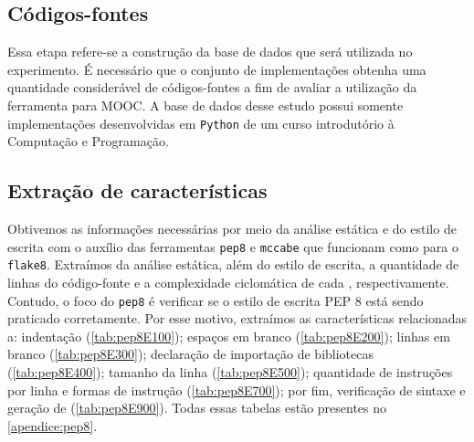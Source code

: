 		\subsection{Códigos-fontes}	
		
			Essa etapa refere-se a construção da base de dados que será utilizada no experimento.
			É necessário que o conjunto de implementações obtenha uma quantidade considerável de
			códigos-fontes a fim de avaliar a utilização da ferramenta para \acs{MOOC}. A
			base de dados desse estudo possui somente implementações desenvolvidas em \texttt{Python}
			de um curso introdutório à Computação e Programação.
			
		\subsection{Extração de características}
					
			Obtivemos as informações necessárias por meio da análise estática e do estilo de   
			escrita com o auxílio das ferramentas \texttt{pep8} \cite{pep8} e \texttt{mccabe}
			\cite{mccabe} que funcionam como  para o \texttt{flake8}.
			Extraímos da análise estática, além do estilo de escrita, a quantidade de linhas
			do código-fonte e a complexidade ciclomática de cada , respectivamente.
			Contudo, o foco do \texttt{pep8} é verificar se o estilo de escrita PEP 8 \cite{van2001pep}
			está sendo praticado corretamente. Por esse motivo, extraímos as características
			relacionadas a: indentação (\cref{tab:pep8E100}); espaços em branco
			(\cref{tab:pep8E200}); linhas em branco (\cref{tab:pep8E300}); declaração de
			importação de bibliotecas (\cref{tab:pep8E400}); tamanho da linha (\cref{tab:pep8E500});
			quantidade de instruções por linha e formas de instrução (\cref{tab:pep8E700}); por fim,
			verificação de sintaxe e geração de  (\cref{tab:pep8E900}). Todas essas
			tabelas estão presentes no \cref{apendice:pep8}.
		
